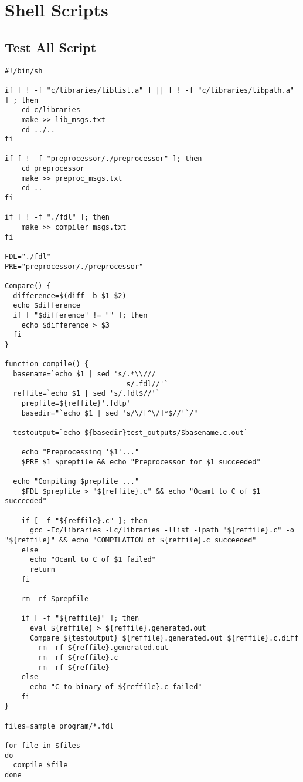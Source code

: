 \documentclass[11pt]{article}
\begin{document}
\newpage
\section{Shell Scripts}

\subsection{Test All Script}

\begin{listing}[H]
  \begin{verbatim}
#!/bin/sh

if [ ! -f "c/libraries/liblist.a" ] || [ ! -f "c/libraries/libpath.a" ] ; then
    cd c/libraries
    make >> lib_msgs.txt
    cd ../..
fi

if [ ! -f "preprocessor/./preprocessor" ]; then
    cd preprocessor
    make >> preproc_msgs.txt
    cd ..
fi

if [ ! -f "./fdl" ]; then
    make >> compiler_msgs.txt
fi

FDL="./fdl"
PRE="preprocessor/./preprocessor"

Compare() {
  difference=$(diff -b $1 $2)
  echo $difference
  if [ "$difference" != "" ]; then
    echo $difference > $3
  fi
}

function compile() {
  basename=`echo $1 | sed 's/.*\\///
                             s/.fdl//'`
  reffile=`echo $1 | sed 's/.fdl$//'`
    prepfile=${reffile}'.fdlp'
    basedir="`echo $1 | sed 's/\/[^\/]*$//'`/"

  testoutput=`echo ${basedir}test_outputs/$basename.c.out`

    echo "Preprocessing '$1'..."
    $PRE $1 $prepfile && echo "Preprocessor for $1 succeeded"

  echo "Compiling $prepfile ..."
    $FDL $prepfile > "${reffile}.c" && echo "Ocaml to C of $1 succeeded"

    if [ -f "${reffile}.c" ]; then
      gcc -Ic/libraries -Lc/libraries -llist -lpath "${reffile}.c" -o "${reffile}" && echo "COMPILATION of ${reffile}.c succeeded"
    else
      echo "Ocaml to C of $1 failed"
      return
    fi

    rm -rf $prepfile

    if [ -f "${reffile}" ]; then
      eval ${reffile} > ${reffile}.generated.out
      Compare ${testoutput} ${reffile}.generated.out ${reffile}.c.diff
        rm -rf ${reffile}.generated.out
        rm -rf ${reffile}.c
        rm -rf ${reffile}
    else
      echo "C to binary of ${reffile}.c failed"
    fi
}

files=sample_program/*.fdl

for file in $files
do
  compile $file
done
  \end{verbatim}
\end{listing}
\end{document}
